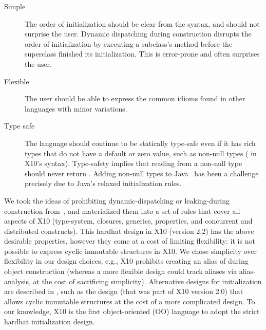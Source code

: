 \begin{description}

  \item[Simple]
    The order of initialization should be clear from the syntax, %
        and should not surprise the user.
    Dynamic dispatching during construction disrupts the order
        of initialization by executing a subclass's method before the superclass finished its initialization.
    This is error-prone and often surprises the user.

  \item[Flexible]
    The user should be able to express the common idioms
        found in other languages with minor variations.

  \item[Type safe]
    The language should continue to be statically type-safe even
        if it has rich types that do not have a default or zero value,
        such as non-null types ( in X10's syntax).
    Type-safety implies that reading from a non-null type should never return .
    Adding non-null types to Java~\cite{Fahndrich:2003:DCN:949305.949332,Fahndrich:2007:EOI:1297027.1297052,XinQi:2009}
        has been a challenge precisely due to
        Java's relaxed initialization rules.
\end{description}

We took the ideas of prohibiting dynamic-dispatching or leaking-\this during construction from~\cite{Gil:2009:WRS:1615184.1615216},
    and materialized them into a set of rules that cover all aspects of X10
    (type-system, closures, generics, properties, and concurrent and distributed constructs).
This hardhat design in X10 (version 2.2) has the above desirable properties,
    however they come at a cost of limiting flexibility:
    it is not possible to express cyclic immutable structures in X10.
We chose simplicity over flexibility in our design choices, e.g.,
    X10 prohibits creating an alias of \this during object construction
    (whereas a more flexible design could track aliases via alias-analysis, at the cost of sacrificing simplicity).
Alternative designs for initialization are described in ,
    such as the  design (that was part of X10 version 2.0) that allows cyclic immutable structures
    at the cost of a more complicated design.
To our knowledge, X10 is the first object-oriented (OO) language to adopt the strict hardhat initialization design.

